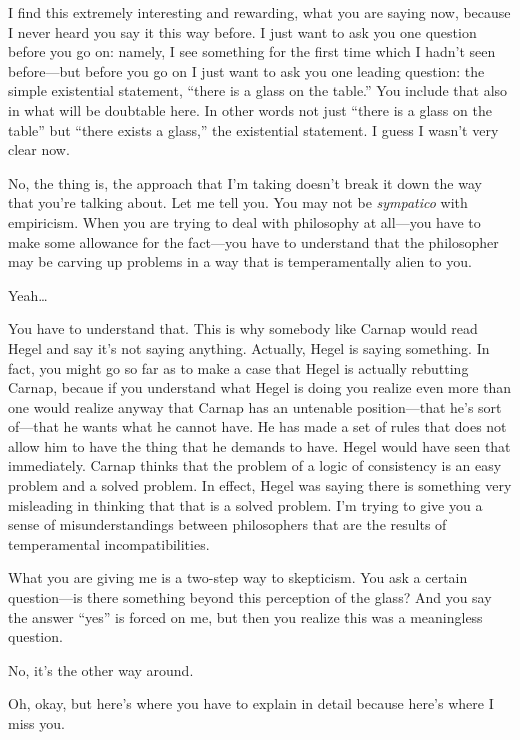  I find this extremely interesting and rewarding, what you are 
saying now, because I never heard you say it this way before. I just want 
to ask you one question before you go on: namely, I see something for 
the first time which I hadn't seen before---but before you go on I just 
want to ask you one leading question: the simple existential statement, 
\enquote{there is a glass on the table.} You include that also in what will be 
doubtable here. In other words not just \enquote{there is a glass on the table} 
but \enquote{there exists a glass,} the existential statement. I guess I wasn't very 
clear now. 

 No, the thing is, the approach that I'm taking doesn't break it 
down the way that you're talking about. Let me tell you. You may not 
be \emph{sympatico} with empiricism. When you are trying to deal with 
philosophy at all---you have to make some allowance for the 
fact---you have to understand that the philosopher may be carving up 
problems in a way that is temperamentally alien to you. 

 Yeah\ldots

 You have to understand that. This is why somebody like 
Carnap would read Hegel and say it's not saying anything. Actually, 
Hegel is saying something. In fact, you might go so far as to make a case 
that Hegel is actually rebutting Carnap, becaue if you understand what 
Hegel is doing you realize even more than one would realize anyway 
that Carnap has an untenable position---that he's sort of---that he 
wants what he cannot have. He has made a set of rules that does not 
allow him to have the thing that he demands to have. Hegel would have 
seen that immediately. Carnap thinks that the problem of a logic of 
consistency is an easy problem and a solved problem. In effect, Hegel 
was saying there is something very misleading in thinking that that is a 
solved problem. I'm trying to give you a sense of misunderstandings 
between philosophers that are the results of temperamental incompatibilities. 


 What you are giving me is a two-step way to skepticism. You 
ask a certain question---is there something beyond this perception of 
the glass? And you say the answer \enquote{yes} is forced on me, but then you 
realize this was a meaningless question. 

 No, it's the other way around. 

 Oh, okay, but here's where you have to explain in detail 
because here's where I miss you. 


